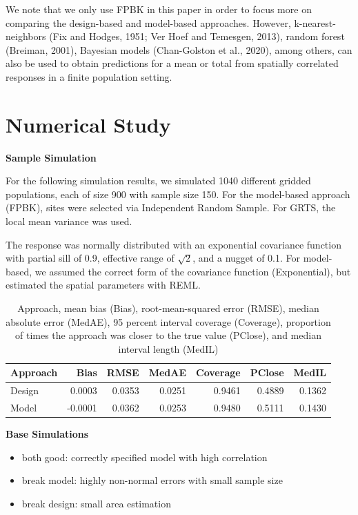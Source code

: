 \documentclass[]{elsarticle} %
\providecommand{\tightlist}{%
  \setlength{\itemsep}{0pt}\setlength{\parskip}{0pt}}
\begin{document}
We note that we only use FPBK in this paper in order to focus more on
comparing the design-based and model-based approaches. However,
k-nearest-neighbors (Fix and Hodges, 1951; Ver Hoef and Temesgen, 2013),
random forest (Breiman, 2001), Bayesian models (Chan-Golston et al.,
2020), among others, can also be used to obtain predictions for a mean
or total from spatially correlated responses in a finite population
setting.

\hypertarget{sec:numstudy}{%
\section{Numerical Study}\label{sec:numstudy}}

\textbf{Sample Simulation}

For the following simulation results, we simulated 1040 different
gridded populations, each of size 900 with sample size 150. For the
model-based approach (FPBK), sites were selected via Independent Random
Sample. For GRTS, the local mean variance was used.

The response was normally distributed with an exponential covariance
function with partial sill of 0.9, effective range of \(\sqrt{2}\), and
a nugget of 0.1. For model-based, we assumed the correct form of the
covariance function (Exponential), but estimated the spatial parameters
with REML.

\begin{table}[ht]
\centering
\begin{tabular}{lrrrrrr}
  \hline
Approach & Bias & RMSE & MedAE & Coverage & PClose & MedIL \\ 
  \hline
Design & 0.0003 & 0.0353 & 0.0251 & 0.9461 & 0.4889 & 0.1362 \\ 
  Model & -0.0001 & 0.0362 & 0.0253 & 0.9480 & 0.5111 & 0.1430 \\ 
   \hline
\end{tabular}
\caption{Approach, mean bias (Bias), root-mean-squared error (RMSE), median absolute error (MedAE), 95 percent interval coverage (Coverage), proportion of times the approach was closer to the true value (PClose), and median interval length (MedIL)} 
\label{tab:sim_one}
\end{table}

\textbf{Base Simulations}

\begin{itemize}
\tightlist
\item
  both good: correctly specified model with high correlation
\item
  break model: highly non-normal errors with small sample size
\item
  break design: small area estimation
\end{itemize}
\end{document}
